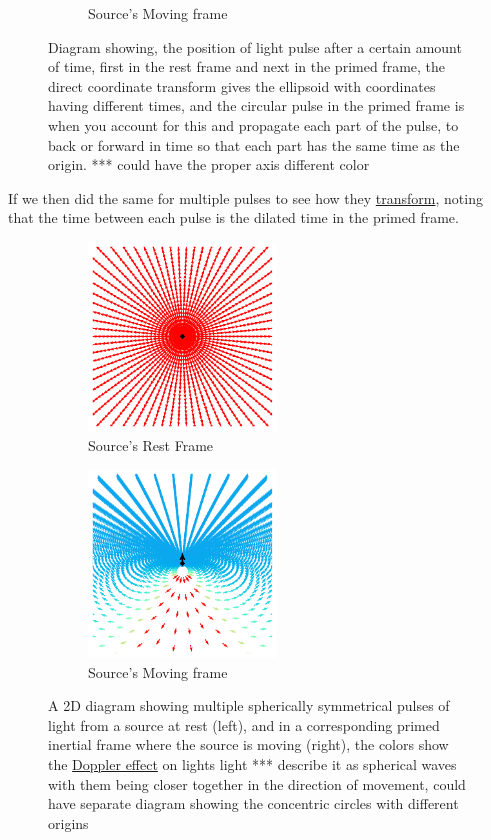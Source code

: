 \begin{figure}[H]
\begin{subfigure}{.32\textwidth}
		\caption{Source's Moving frame}
	\end{subfigure}
	\caption{Diagram showing, the position of light pulse after a certain amount of time, first in the rest frame and next in the primed frame, the direct coordinate transform gives the ellipsoid with coordinates having different times, and the circular pulse in the primed frame is when you account for this and propagate each part of the pulse, to back or forward in time so that each part has the same time as the origin. *** could have the proper axis different color}
\end{figure}

If we then did the same for multiple pulses to see how they \hyperlink{def-transform}{transform}, noting that the time between each pulse is the dilated time in the primed frame.

\begin{figure}[H]
	\begin{subfigure}{.49\textwidth}
		\centering
		\includegraphics[width=5cm]{images/pdf/Field_Rest_Frame.pdf}
		\caption{Source's Rest Frame}
	\end{subfigure}
	\begin{subfigure}{.49\textwidth}
		\centering
		\includegraphics[width=5cm]{images/pdf/Field_Moving_Frame_Doppler.pdf}
		\caption{Source's Moving frame}
	\end{subfigure}
	\caption{A 2D diagram showing multiple spherically symmetrical pulses of light from a source at rest (left), and in a corresponding primed inertial frame where the source is moving (right), the colors show the \protect\hyperlink{def-doppler-effect}{Doppler effect} on lights light *** describe it as spherical waves with them being closer together in the direction of movement, could have separate diagram showing the concentric circles with different origins}
	\label{fig: full field transformation}
\end{figure}

